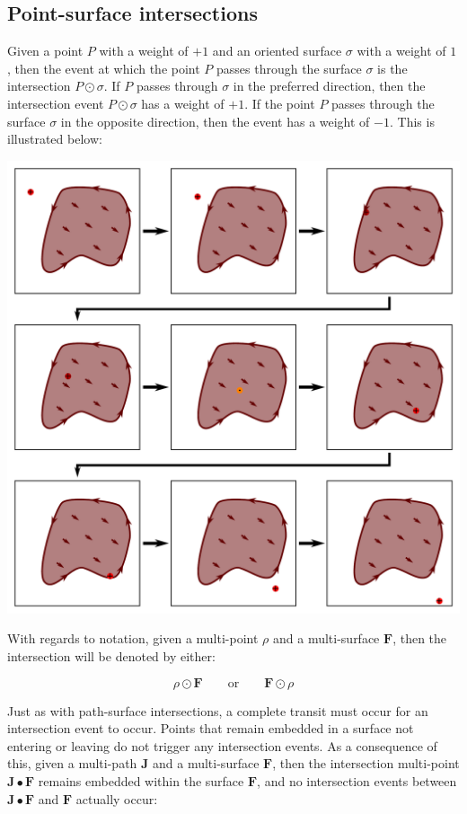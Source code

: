 \subsection{Point-surface intersections}

Given a point \(P\) with a weight of \(+1\) and an oriented surface \(\sigma\) with a weight of \(1\), then the event at which the point \(P\) passes through the surface \(\sigma\) is the intersection \(P \odot \sigma\). If \(P\) passes through \(\sigma\) in the preferred direction, then the intersection event \(P \odot \sigma\) has a weight of \(+1\). If the point \(P\) passes through the surface \(\sigma\) in the opposite direction, then the event has a weight of \(-1\). This is illustrated below:   

\begin{center}
\includegraphics[width = \textwidth]{Time/point_surface_intersections}
\end{center}

With regards to notation, given a multi-point \(\rho\) and a multi-surface \(\mathbf{F}\), then the intersection will be denoted by either: 

\[\rho \odot \mathbf{F} \quad\quad\text{or}\quad\quad \mathbf{F} \odot \rho\]

Just as with path-surface intersections, a complete transit must occur for an intersection event to occur. Points that remain embedded in a surface not entering or leaving do not trigger any intersection events. As a consequence of this, given a multi-path \(\mathbf{J}\) and a multi-surface \(\mathbf{F}\), then the intersection multi-point \(\mathbf{J} \bullet \mathbf{F}\) remains embedded within the surface \(\mathbf{F}\), and no intersection events between \(\mathbf{J} \bullet \mathbf{F}\) and \(\mathbf{F}\) actually occur: 

